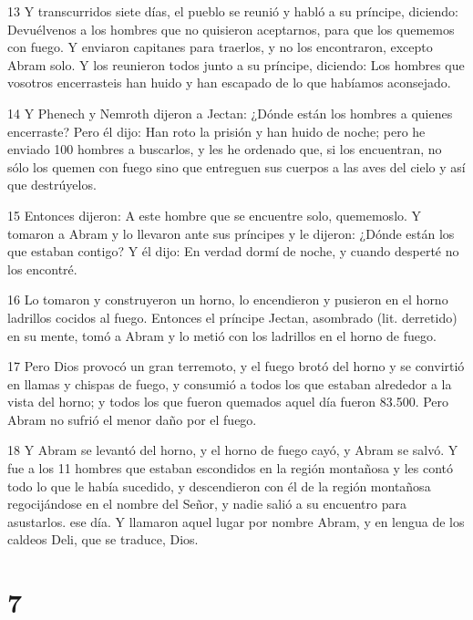 \par 13 Y transcurridos siete días, el pueblo se reunió y habló a su príncipe, diciendo: Devuélvenos a los hombres que no quisieron aceptarnos, para que los quememos con fuego. Y enviaron capitanes para traerlos, y no los encontraron, excepto Abram solo. Y los reunieron todos junto a su príncipe, diciendo: Los hombres que vosotros encerrasteis han huido y han escapado de lo que habíamos aconsejado.

\par 14 Y Phenech y Nemroth dijeron a Jectan: ¿Dónde están los hombres a quienes encerraste? Pero él dijo: Han roto la prisión y han huido de noche; pero he enviado 100 hombres a buscarlos, y les he ordenado que, si los encuentran, no sólo los quemen con fuego sino que entreguen sus cuerpos a las aves del cielo y así que destrúyelos.

\par 15 Entonces dijeron: A este hombre que se encuentre solo, quememoslo. Y tomaron a Abram y lo llevaron ante sus príncipes y le dijeron: ¿Dónde están los que estaban contigo? Y él dijo: En verdad dormí de noche, y cuando desperté no los encontré.

\par 16 Lo tomaron y construyeron un horno, lo encendieron y pusieron en el horno ladrillos cocidos al fuego. Entonces el príncipe Jectan, asombrado (lit. derretido) en su mente, tomó a Abram y lo metió con los ladrillos en el horno de fuego.

\par 17 Pero Dios provocó un gran terremoto, y el fuego brotó del horno y se convirtió en llamas y chispas de fuego, y consumió a todos los que estaban alrededor a la vista del horno; y todos los que fueron quemados aquel día fueron 83.500. Pero Abram no sufrió el menor daño por el fuego.

\par 18 Y Abram se levantó del horno, y el horno de fuego cayó, y Abram se salvó. Y fue a los 11 hombres que estaban escondidos en la región montañosa y les contó todo lo que le había sucedido, y descendieron con él de la región montañosa regocijándose en el nombre del Señor, y nadie salió a su encuentro para asustarlos. ese día. Y llamaron aquel lugar por nombre Abram, y en lengua de los caldeos Deli, que se traduce, Dios.



\chapter{7}

